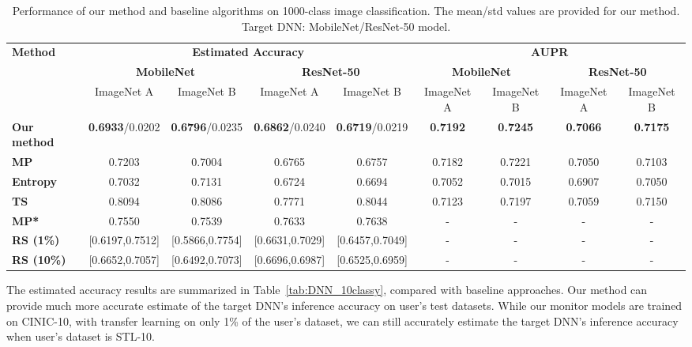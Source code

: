 \documentclass{article}
\begin{document}
\begin{table*}[!t]
	\centering
	\caption{Performance of our method and baseline algorithms on 1000-class image classification. The mean/std values are provided for our method. Target DNN: MobileNet/ResNet-50 model.}
	\setlength{\tabcolsep}{2.5pt}
	\vspace{-0.1cm}
	\small
	\begin{tabular}{l|cccc|cccc}
		\hline
		\multirow{3}{*}{\textbf{Method}} & \multicolumn{4}{c|}{\textbf{Estimated Accuracy}} & \multicolumn{4}{c}{\textbf{AUPR}}\\
		\cline{2-9}      & \multicolumn{2}{c}{\textbf{MobileNet}} & \multicolumn{2}{c|}{\textbf{ResNet-50}} & \multicolumn{2}{c}{\textbf{MobileNet}} & \multicolumn{2}{c}{\textbf{ResNet-50}} \\
		\cline{2-9}      & ImageNet A & ImageNet B & ImageNet A & ImageNet B & ImageNet A & ImageNet B & ImageNet A & ImageNet B \\
		\hline
		\multicolumn{1}{p{5.5em}|}{\textbf{Our method}} & \textbf{0.6933}/0.0202 & \textbf{0.6796}/0.0235 & \textbf{0.6862}/0.0240 & \textbf{0.6719}/0.0219 & \textbf{0.7192} & \textbf{0.7245} & \textbf{0.7066} & \textbf{0.7175}\\
		\multicolumn{1}{p{5.5em}|}{\textbf{MP}} & 0.7203 & 0.7004 & 0.6765 & 0.6757 & 0.7182 & 0.7221 & 0.7050 & 0.7103 \\
		\multicolumn{1}{p{5.5em}|}{\textbf{Entropy}} & 0.7032 & 0.7131 & 0.6724 & 0.6694 & 0.7052 & 0.7015 & 0.6907 & 0.7050 \\
		\textbf{TS} & 0.8094 & 0.8086 & 0.7771 & 0.8044 & 0.7123 & 0.7197 & 0.7059 & 0.7150 \\
		\multicolumn{1}{p{5.5em}|}{\textbf{MP*}} & 0.7550 & 0.7539 & 0.7633 & 0.7638 & -     & -     & -     & - \\
		\textbf{RS (1\%)} & [0.6197,0.7512] & [0.5866,0.7754] & [0.6631,0.7029] & [0.6457,0.7049] & -     & -     & -     & - \\
		\textbf{RS (10\%)} & [0.6652,0.7057] & [0.6492,0.7073] & [0.6696,0.6987] & [0.6525,0.6959] & -     & -     & -     & - \\
		\hline
	\end{tabular}
	
	
	\label{tab:DNN_1000class}
	\vspace{-0.3cm}
\end{table*}

The estimated accuracy results are summarized in Table~\ref{tab:DNN_10classy}, compared with baseline approaches.
Our method can provide much more accurate
estimate of the target DNN's inference accuracy on user's test
datasets. While our monitor models are trained
on CINIC-10, with transfer learning on only 1\% of the user's dataset, we can still accurately estimate
the target DNN's inference accuracy when user's
dataset is STL-10.
\end{document}

